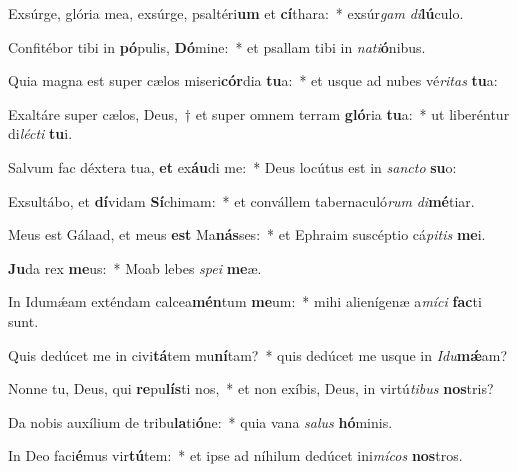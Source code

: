 \item Exsúrge, glória mea, exsúrge, psaltéri\textbf{um} et \textbf{cí}thara:~* exsúr\textit{gam} \textit{di}\textbf{lú}culo.
\item Confitébor tibi in \textbf{pó}pulis, \textbf{Dó}mine:~* et psallam tibi in \textit{na}\textit{ti}\textbf{ó}nibus.
\item Quia magna est super cælos miseri\textbf{cór}dia \textbf{tu}a:~* et usque ad nubes vé\textit{ri}\textit{tas} \textbf{tu}a:
\item Exaltáre super cælos, Deus,~† et super omnem terram \textbf{gló}ria \textbf{tu}a:~* ut liberéntur di\textit{léc}\textit{ti} \textbf{tu}i.
\item Salvum fac déxtera tua, \textbf{et} ex\textbf{áu}di me:~* Deus locútus est in \textit{sanc}\textit{to} \textbf{su}o:
\item Exsultábo, et \textbf{dí}vidam \textbf{Sí}chimam:~* et convállem tabernaculó\textit{rum} \textit{di}\textbf{mé}tiar.
\item Meus est Gálaad, et meus \textbf{est} Ma\textbf{nás}ses:~* et Ephraim suscéptio cá\textit{pi}\textit{tis} \textbf{me}i.
\item \textbf{Ju}da rex \textbf{me}us:~* Moab lebes \textit{spe}\textit{i} \textbf{me}æ.
\item In Idumǽam exténdam calcea\textbf{mén}tum \textbf{me}um:~* mihi alienígenæ a\textit{mí}\textit{ci} \textbf{fac}ti sunt.
\item Quis dedúcet me in civi\textbf{tá}tem mu\textbf{ní}tam?~* quis dedúcet me usque in \textit{I}\textit{du}\textbf{mǽ}am?
\item Nonne tu, Deus, qui \textbf{re}pu\textbf{lís}ti nos,~* et non exíbis, Deus, in virtú\textit{ti}\textit{bus} \textbf{nos}tris?
\item Da nobis auxílium de tribu\textbf{la}ti\textbf{ó}ne:~* quia vana \textit{sa}\textit{lus} \textbf{hó}minis.
\item In Deo faci\textbf{é}mus vir\textbf{tú}tem:~* et ipse ad níhilum dedúcet ini\textit{mí}\textit{cos} \textbf{nos}tros.
